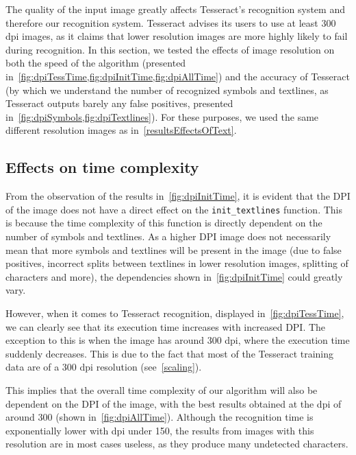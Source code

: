 The quality of the input image greatly affects Tesseract's recognition system and therefore our recognition system. Tesseract advises its users to use at least 300 dpi images, as it claims that lower resolution images are more highly likely to fail during recognition. In this section, we tested the effects of image resolution on both the speed of the algorithm (presented in~\cref{fig:dpiTessTime,fig:dpiInitTime,fig:dpiAllTime}) and the accuracy of Tesseract (by which we understand the number of recognized symbols and textlines, as Tesseract outputs barely any false positives, presented in~\cref{fig:dpiSymbols,fig:dpiTextlines}). For these purposes, we used the same different resolution images as in~\cref{resultsEffectsOfText}.

\subsection{Effects on time complexity}

From the observation of the results in~\cref{fig:dpiInitTime}, it is evident that the DPI of the image does not have a direct effect on the \texttt{init\_textlines} function. This is because the time complexity of this function is directly dependent on the number of symbols and textlines. As a higher DPI image does not necessarily mean that more symbols and textlines will be present in the image (due to false positives, incorrect splits between textlines in lower resolution images, splitting of characters and more), the dependencies shown in~\cref{fig:dpiInitTime} could greatly vary.

However, when it comes to Tesseract recognition, displayed in~\cref{fig:dpiTessTime}, we can clearly see that its execution time increases with increased DPI. The exception to this is when the image has around 300 dpi, where the execution time suddenly decreases. This is due to the fact that most of the Tesseract training data are of a 300 dpi resolution (see~\cref{scaling}).

This implies that the overall time complexity of our algorithm will also be dependent on the DPI of the image, with the best results obtained at the dpi of around 300 (shown in~\cref{fig:dpiAllTime}). Although the recognition time is exponentially lower with dpi under 150, the results from images with this resolution are in most cases useless, as they produce many undetected characters.

